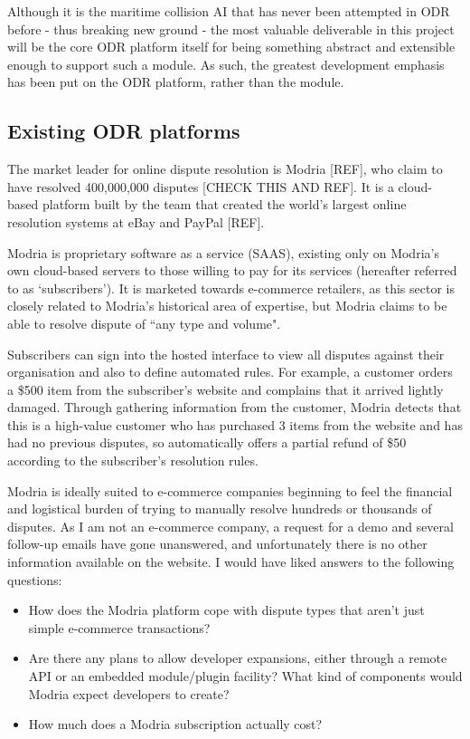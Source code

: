 Although it is the maritime collision AI that has never been attempted in ODR before - thus breaking new ground - the most valuable deliverable in this project will be the core ODR platform itself for being something abstract and extensible enough to support such a module. As such, the greatest development emphasis has been put on the ODR platform, rather than the module.

\subsection{Existing ODR platforms}

The market leader for online dispute resolution is Modria [REF], who claim to have resolved 400,000,000 disputes [CHECK THIS AND REF]. It is a cloud-based platform built by the team that created the world's largest online resolution systems at eBay and PayPal [REF].

Modria is proprietary software as a service (SAAS), existing only on Modria's own cloud-based servers to those willing to pay for its services (hereafter referred to as `subscribers'). It is marketed towards e-commerce retailers, as this sector is closely related to Modria's historical area of expertise, but Modria claims to be able to resolve dispute of  ``any type and volume". %

Subscribers can sign into the hosted interface to view all disputes against their organisation and also to define automated rules. For example, a customer orders a \$500 item from the subscriber's website and complains that it arrived lightly damaged. Through gathering information from the customer, Modria detects that this is a high-value customer who has purchased 3 items from the website and has had no previous disputes, so automatically offers a partial refund of \$50 according to the subscriber's resolution rules. %

Modria is ideally suited to e-commerce companies beginning to feel the financial and logistical burden of trying to manually resolve hundreds or thousands of disputes. As I am not an e-commerce company, a request for a demo and several follow-up emails have gone unanswered, and unfortunately there is no other information available on the website. I would have liked answers to the following questions:

\begin{itemize}
\item How does the Modria platform cope with dispute types that aren't just simple e-commerce transactions?
\item Are there any plans to allow developer expansions, either through a remote API or an embedded module/plugin facility? What kind of components would Modria expect developers to create?
\item How much does a Modria subscription actually cost?
\end{itemize}


